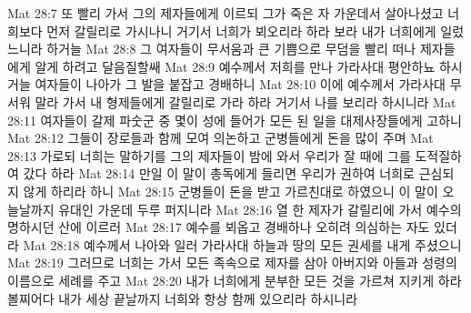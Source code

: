 Mat 28:7  또 빨리 가서 그의 제자들에게 이르되 그가 죽은 자 가운데서 살아나셨고 너희보다 먼저 갈릴리로 가시나니 거기서 너희가 뵈오리라 하라 보라 내가 너희에게 일렀느니라 하거늘
Mat 28:8  그 여자들이 무서움과 큰 기쁨으로 무덤을 빨리 떠나 제자들에게 알게 하려고 달음질할쌔
Mat 28:9  예수께서 저희를 만나 가라사대 평안하뇨 하시거늘 여자들이 나아가 그 발을 붙잡고 경배하니
Mat 28:10  이에 예수께서 가라사대 무서워 말라 가서 내 형제들에게 갈릴리로 가라 하라 거기서 나를 보리라 하시니라
Mat 28:11  여자들이 갈제 파숫군 중 몇이 성에 들어가 모든 된 일을 대제사장들에게 고하니
Mat 28:12  그들이 장로들과 함께 모여 의논하고 군병들에게 돈을 많이 주며
Mat 28:13  가로되 너희는 말하기를 그의 제자들이 밤에 와서 우리가 잘 때에 그를 도적질하여 갔다 하라
Mat 28:14  만일 이 말이 총독에게 들리면 우리가 권하여 너희로 근심되지 않게 하리라 하니
Mat 28:15  군병들이 돈을 받고 가르친대로 하였으니 이 말이 오늘날까지 유대인 가운데 두루 퍼지니라
Mat 28:16  열 한 제자가 갈릴리에 가서 예수의 명하시던 산에 이르러
Mat 28:17  예수를 뵈옵고 경배하나 오히려 의심하는 자도 있더라
Mat 28:18  예수께서 나아와 일러 가라사대 하늘과 땅의 모든 권세를 내게 주셨으니
Mat 28:19  그러므로 너희는 가서 모든 족속으로 제자를 삼아 아버지와 아들과 성령의 이름으로 세례를 주고
Mat 28:20  내가 너희에게 분부한 모든 것을 가르쳐 지키게 하라 볼찌어다 내가 세상 끝날까지 너희와 항상 함께 있으리라 하시니라


